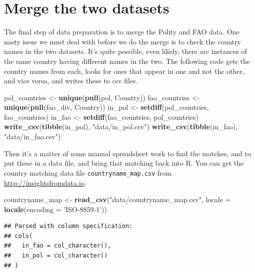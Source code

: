 \documentclass[]{book}
\newenvironment{Shaded}{\begin{snugshade}}{\end{snugshade}}
\newcommand{\DataTypeTok}[1]{\textcolor[rgb]{0.13,0.29,0.53}{#1}}
\newcommand{\KeywordTok}[1]{\textcolor[rgb]{0.13,0.29,0.53}{\textbf{#1}}}
\newcommand{\NormalTok}[1]{#1}
\newcommand{\StringTok}[1]{\textcolor[rgb]{0.31,0.60,0.02}{#1}}
\begin{document}
\hypertarget{merge-the-two-datasets}{%
\section{Merge the two datasets}\label{merge-the-two-datasets}}

The final step of data preparation is to merge the Polity and FAO data. One nasty issue we must deal with before we do the merge is to check the country names in the two datasets. It's quite possible, even likely, there are instances of the same country having different names in the two. The following code gets the country names from each, looks for ones that appear in one and not the other, and vice versa, and writes these to csv files.

\begin{Shaded}
\begin{Highlighting}[]
\NormalTok{pol_countries <-}\StringTok{ }\KeywordTok{unique}\NormalTok{(}\KeywordTok{pull}\NormalTok{(pol, Country))}
\NormalTok{fao_countries <-}\StringTok{ }\KeywordTok{unique}\NormalTok{(}\KeywordTok{pull}\NormalTok{(fao_div, Country))}
\NormalTok{in_pol <-}\StringTok{ }\KeywordTok{setdiff}\NormalTok{(pol_countries, fao_countries)}
\NormalTok{in_fao <-}\StringTok{ }\KeywordTok{setdiff}\NormalTok{(fao_countries, pol_countries)}
\KeywordTok{write_csv}\NormalTok{(}\KeywordTok{tibble}\NormalTok{(in_pol), }\StringTok{"data/in_pol.csv"}\NormalTok{)}
\KeywordTok{write_csv}\NormalTok{(}\KeywordTok{tibble}\NormalTok{(in_fao), }\StringTok{"data/in_fao.csv"}\NormalTok{)}
\end{Highlighting}
\end{Shaded}

Then it's a matter of some manual spreadsheet work to find the matches, and to put these in a data file, and bring that matching back into R. You can get the country matching data file \texttt{countryname\_map.csv} from \url{http://insightsfromdata.io}.

\begin{Shaded}
\begin{Highlighting}[]
\NormalTok{countryname_map <-}\StringTok{ }\KeywordTok{read_csv}\NormalTok{(}\StringTok{"data/countryname_map.csv"}\NormalTok{,}
                            \DataTypeTok{locale =} \KeywordTok{locale}\NormalTok{(}\DataTypeTok{encoding =} \StringTok{'ISO-8859-1'}\NormalTok{))}
\end{Highlighting}
\end{Shaded}

\begin{verbatim}
## Parsed with column specification:
## cols(
##   in_fao = col_character(),
##   in_pol = col_character()
## )
\end{verbatim}
\end{document}
